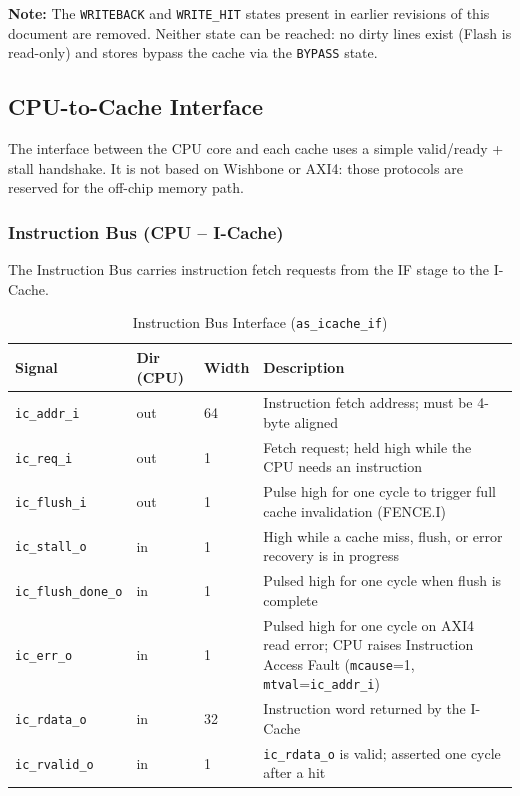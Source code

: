 \textbf{Note:} The \texttt{WRITEBACK} and \texttt{WRITE\_HIT} states present
in earlier revisions of this document are removed.
Neither state can be reached: no dirty lines exist (Flash is read-only) and
stores bypass the cache via the \texttt{BYPASS} state.

\subsection{CPU-to-Cache Interface}

The interface between the CPU core and each cache uses a simple
valid/ready + stall handshake.
It is not based on Wishbone or AXI4: those protocols are reserved for
the off-chip memory path.

\subsubsection{Instruction Bus (CPU -- I-Cache)}
\label{subsec:iBusIf}

The Instruction Bus carries instruction fetch requests from the IF stage
to the I-Cache.

\begin{table}[H]
\caption{Instruction Bus Interface (\texttt{as\_icache\_if})}
\label{tab:asIBusIO}
\centering
\begin{tabularx}{\textwidth}{|l |l |l |X|}
  \hline
  Signal & Dir (CPU) & Width & Description \\
  \hline
  \hline
  \texttt{ic\_addr\_i}       & out & 64 & Instruction fetch address; must be 4-byte aligned \\
  \hline
  \texttt{ic\_req\_i}        & out & 1  & Fetch request; held high while the CPU needs an instruction \\
  \hline
  \texttt{ic\_flush\_i}      & out & 1  & Pulse high for one cycle to trigger full cache invalidation (FENCE.I) \\
  \hline
  \texttt{ic\_stall\_o}      & in  & 1  & High while a cache miss, flush, or error recovery is in progress \\
  \hline
  \texttt{ic\_flush\_done\_o}& in  & 1  & Pulsed high for one cycle when flush is complete \\
  \hline
  \texttt{ic\_err\_o}        & in  & 1  & Pulsed high for one cycle on AXI4 read error;
                                          CPU raises Instruction Access Fault (\texttt{mcause}=1,
                                          \texttt{mtval}=\texttt{ic\_addr\_i}) \\
  \hline
  \texttt{ic\_rdata\_o}      & in  & 32 & Instruction word returned by the I-Cache \\
  \hline
  \texttt{ic\_rvalid\_o}     & in  & 1  & \texttt{ic\_rdata\_o} is valid; asserted one cycle after a hit \\
  \hline
\end{tabularx}
\end{table}

